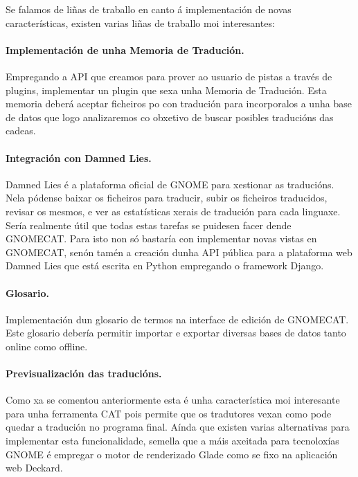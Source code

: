 Se falamos de liñas de traballo en canto á implementación de novas características, existen varias liñas de traballo moi interesantes:

\paragraph{Implementación de unha Memoria de Tradución.} Empregando a API que creamos para prover ao usuario de pistas a través de plugins, implementar un plugin que sexa unha Memoria de Tradución. Esta memoria deberá aceptar ficheiros po  con tradución para incorporalos a unha base de datos que logo analizaremos co obxetivo de buscar posibles traducións das cadeas.

\paragraph{Integración con Damned Lies.} Damned Lies é a plataforma oficial de GNOME para xestionar as traducións. Nela pódense baixar os ficheiros para traducir, subir os ficheiros traducidos, revisar os mesmos, e ver as estatísticas xerais de tradución para cada linguaxe. Sería realmente útil que todas estas tarefas se puidesen facer dende GNOMECAT. Para isto non só bastaría con implementar novas vistas en GNOMECAT, senón tamén a creación dunha API pública para a plataforma web Damned Lies que está escrita en Python empregando o framework Django.

\paragraph{Glosario.} Implementación dun glosario de termos na interface de edición de GNOMECAT. Este glosario debería permitir importar e exportar diversas bases de datos tanto online como offline.

\paragraph{Previsualización das traducións.} Como xa se comentou anteriormente esta é unha característica moi interesante para unha ferramenta CAT pois permite que os tradutores vexan como pode quedar a tradución no programa final. Aínda que existen varias alternativas para implementar esta funcionalidade, semella que a máis axeitada para tecnoloxías GNOME é empregar o motor de renderizado Glade como se fixo na aplicación web Deckard.
